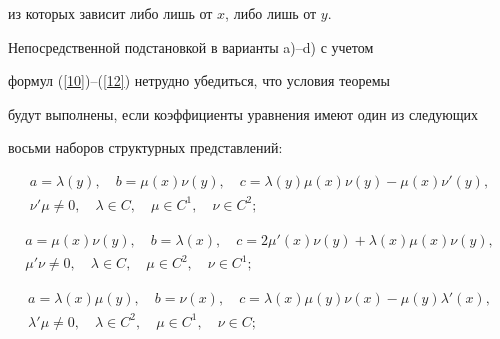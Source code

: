 из которых зависит либо лишь от $x$, либо лишь от $y$.


Непосредственной подстановкой в варианты a)--d) с учетом


формул (\ref{10})--(\ref{12}) нетрудно убедиться, что условия теоремы


будут выполнены, если коэффициенты уравнения имеют один из следующих


восьми наборов структурных представлений:


\begin{equation}\label{14}


\begin{array}{c}


a=\lambda(y),\quad b=\mu(x)\nu(y),\quad


c=\lambda(y)\mu(x)\nu(y)-\mu(x)\nu'(y),\\[2mm]


\nu'\mu\ne0,\quad \lambda\in C,\quad \mu\in C^1,


\quad \nu\in C^2;


\end{array}


\end{equation}


\begin{equation}\label{15}


\begin{array}{c}


a=\mu(x)\nu(y),\quad b=\lambda(x),\quad


c=2\mu'(x)\nu(y)+\lambda(x)\mu(x)\nu(y),\\[2mm]


\mu'\nu\ne0,\quad \lambda\in C,\quad \mu\in C^2,


\quad \nu\in C^1;


\end{array}


\end{equation}


\begin{equation}\label{16}


\begin{array}{c}


a=\lambda(x)\mu(y),\quad b=\nu(x),\quad


c=\lambda(x)\mu(y)\nu(x)-\mu(y)\lambda'(x),\\[2mm]


\lambda'\mu\ne0,\quad \lambda\in C^2,\quad \mu\in C^1,


\quad \nu\in C;


\end{array}


\end{equation}


